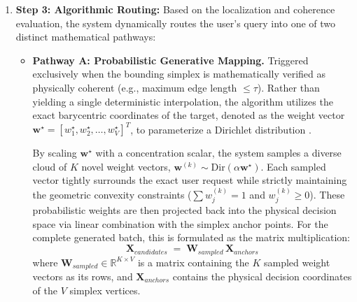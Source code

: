 \begin{enumerate}
    If a bounding simplex is found in Step 1, the system retrieves the decision configurations ($x_A, x_B, x_C$) corresponding to the anchors and calculates their pairwise Euclidean distances. The region is evaluated against the Coherence Gate:
    \begin{itemize}
        \item \textit{Coherent Region:} If all pairwise distances are $\le \tau$, the anchors share the same physical strategy. The region is deemed safe for geometric interpolation.
        \item \textit{Incoherent Region:} If any distance is $> \tau$, the anchors represent fundamentally different engineering strategies. To avoid non-linear topological voids—which can be further mapped and rigorously detected using tools like Topological Data Analysis (TDA) and the Vietoris-Rips complex \cite{carlsson2009topology}—the system refuses interpolation to guarantee physical safety.
    \end{itemize}

    \item \textbf{Step 3: Algorithmic Routing:} 
    Based on the localization and coherence evaluation, the system dynamically routes the user's query into one of two distinct mathematical pathways:
    \begin{itemize}
        \item \textbf{Pathway A: Probabilistic Generative Mapping.} Triggered exclusively when the bounding simplex is mathematically verified as physically coherent (e.g., maximum edge length $\le \tau$). Rather than yielding a single deterministic interpolation, the algorithm utilizes the exact barycentric coordinates of the target, denoted as the weight vector $\mathbf{w}^{\star} = [w_1^{\star}, w_2^{\star}, \dots, w_{V}^{\star}]^T$, to parameterize a Dirichlet distribution \cite{bishop2006pattern}. 
    
        By scaling $\mathbf{w}^{\star}$ with a concentration scalar, the system samples a diverse cloud of $K$ novel weight vectors, $\mathbf{w}^{(k)} \sim \mathrm{Dir}(\alpha \mathbf{w}^{\star})$. Each sampled vector tightly surrounds the exact user request while strictly maintaining the geometric convexity constraints ($\sum w_j^{(k)} = 1$ and $w_j^{(k)} \ge 0$). These probabilistic weights are then projected back into the physical decision space via linear combination with the simplex anchor points. For the complete generated batch, this is formulated as the matrix multiplication:
        \begin{equation}
            \mathbf{X}_{candidates} \;=\; \mathbf{W}_{sampled} \, \mathbf{X}_{anchors}
            \label{eq:pathway_a_matrix}
        \end{equation}
        where $\mathbf{W}_{sampled} \in \mathbb{R}^{K \times V}$ is a matrix containing the $K$ sampled weight vectors as its rows, and $\mathbf{X}_{anchors}$ contains the physical decision coordinates of the $V$ simplex vertices. 
        

\end{itemize}
\end{enumerate}

